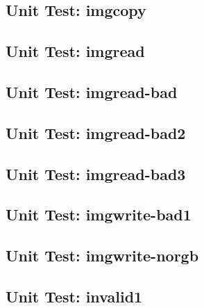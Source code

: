 \subsection*{Unit Test: imgcopy}

 \clearpage
\subsection*{Unit Test: imgread}

 \clearpage
\subsection*{Unit Test: imgread-bad}

 \clearpage
\subsection*{Unit Test: imgread-bad2}

 \clearpage
\subsection*{Unit Test: imgread-bad3}

 \clearpage
\subsection*{Unit Test: imgwrite-bad1}

 \clearpage
\subsection*{Unit Test: imgwrite-norgb}

 \clearpage
\subsection*{Unit Test: invalid1}

 \clearpage
